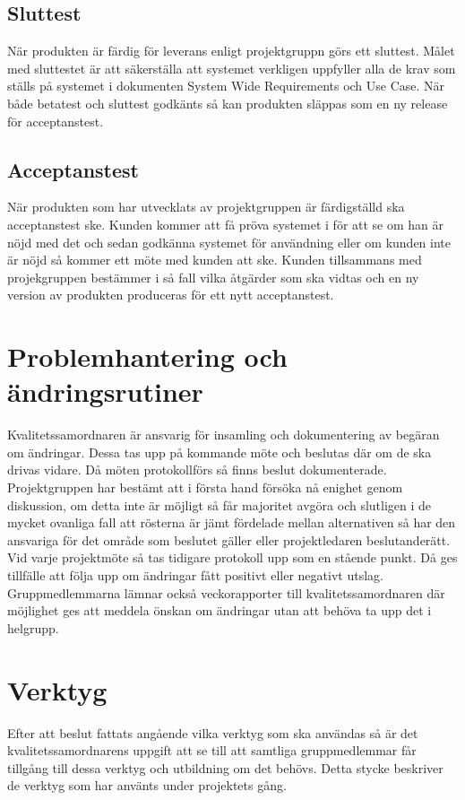 \subsection{Sluttest}
När produkten är färdig för leverans enligt projektgruppn görs ett sluttest. Målet med sluttestet är att säkerställa att systemet verkligen uppfyller alla de krav som ställs på systemet i dokumenten System Wide Requirements och Use Case. När både betatest och sluttest godkänts så kan produkten släppas som en ny release för acceptanstest.

\subsection{Acceptanstest}
När produkten som har utvecklats av projektgruppen är färdigställd ska acceptanstest ske. Kunden kommer att få pröva systemet i för att se om han är nöjd med det och sedan godkänna systemet för användning eller om kunden inte är nöjd så kommer ett möte med kunden att ske. Kunden tillsammans med projekgruppen bestämmer i så fall vilka åtgärder som ska vidtas och en ny version av produkten produceras för ett nytt acceptanstest.

\section{Problemhantering och ändringsrutiner}
Kvalitetssamordnaren är ansvarig för insamling och dokumentering av begäran om ändringar. Dessa tas upp på kommande möte och beslutas där om de ska drivas vidare. Då möten protokollförs så finns beslut dokumenterade. Projektgruppen har bestämt att i första hand försöka nå enighet genom diskussion, om detta inte är möjligt så får majoritet avgöra och slutligen i de mycket ovanliga fall att rösterna är jämt fördelade mellan alternativen så har den ansvariga för det område som beslutet gäller eller projektledaren beslutanderätt. Vid varje projektmöte så tas tidigare protokoll upp som en stående punkt. Då ges tillfälle att följa upp om ändringar fått positivt eller negativt utslag. Gruppmedlemmarna lämnar också veckorapporter till kvalitetssamordnaren där möjlighet ges att meddela önskan om ändringar utan att behöva ta upp det i helgrupp.

\section{Verktyg}
Efter att beslut fattats angående vilka verktyg som ska användas så är det kvalitetssamordnarens uppgift att se till att samtliga gruppmedlemmar får tillgång till dessa verktyg och utbildning om det behövs. Detta stycke beskriver de verktyg som har använts under projektets gång.

